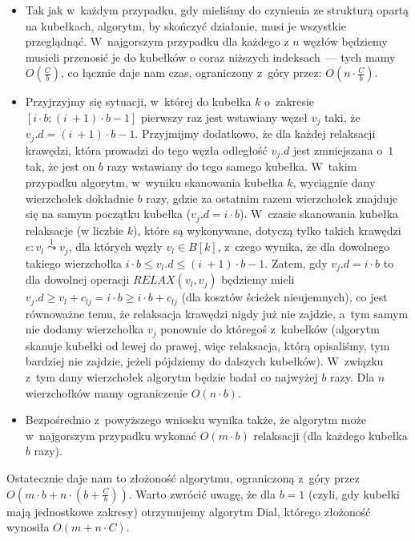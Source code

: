 \begin{itemize}
\item Tak jak w~każdym przypadku, gdy mieliśmy do czynienia ze strukturą opartą na kubełkach, algorytm, by skończyć działanie, musi je wszystkie przeglądnąć. W~najgorszym przypadku dla każdego z $n$ węzłów będziemy musieli przenosić je do kubełków o coraz niższych indeksach~--- tych mamy $O \left( \frac{C}{b} \right)$, co łącznie daje nam czas, ograniczony z~góry przez: $O \left( n \cdot \frac{C}{b} \right)$.
\item Przyjrzyjmy się sytuacji, w~której do kubełka $k$ o~zakresie $\left[ i \cdot b ; \left( i~+ 1 \right) \cdot b - 1 \right]$ pierwszy raz jest wstawiany węzeł $v_{j}$ taki, że $v_{j}.d = \left( i~+ 1 \right) \cdot b - 1$. Przyjmijmy dodatkowo, że dla każdej relaksacji krawędzi, która prowadzi do tego węzła odległość $v_{j}.d$ jest zmniejszana o~$1$ tak, że jest on $b$ razy wstawiany do tego samego kubełka. W~takim przypadku algorytm, w~wyniku skanowania kubełka $k$, wyciągnie dany wierzchołek dokładnie $b$ razy, gdzie za ostatnim razem wierzchołek znajduje się na samym początku kubełka ($v_{j}.d = i \cdot b$). W~czasie skanowania kubełka relaksacje (w liczbie $k$), które są wykonywane, dotyczą tylko takich krawędzi $e : v_{l} \overset{1}\leadsto v_{j}$, dla których węzły $v_{l} \in B \left[ k \right]$, z~czego wynika, że dla dowolnego takiego wierzchołka $ i \cdot b \leqslant v_{l}.d \leqslant \left( i~+ 1 \right) \cdot b - 1$. Zatem, gdy $v_{j}.d = i \cdot b$ to dla dowolnej operacji $RELAX \left( v_{l}, v_{j} \right)$ będziemy mieli $ v_{j}.d \geqslant v_{l} + c_{lj} = i \cdot b \geqslant i \cdot b + c_{lj}$ (dla kosztów ścieżek nieujemnych), co jest równoważne temu, że relaksacja krawędzi nigdy już nie zajdzie, a~tym samym nie dodamy wierzchołka $v_{j}$ ponownie do któregoś z~kubełków (algorytm skanuje kubełki od lewej do prawej, więc relaksacja, którą opisaliśmy, tym bardziej nie zajdzie, jeżeli pójdziemy do dalszych kubełków). W~związku z~tym dany  wierzchołek algorytm będzie badał co najwyżej $b$ razy. Dla $n$ wierzchołków mamy ograniczenie $O \left( n \cdot b \right)$.
\item Bezpośrednio z~powyższego wniosku wynika także, że algorytm może w~najgorszym przypadku wykonać $O \left( m \cdot b \right)$ relaksacji (dla każdego kubełka $b$ razy).
\end{itemize}

Ostatecznie daje nam to złożoność algorytmu, ograniczoną z~góry przez $ O \left( m \cdot b + n \cdot \left( b + \frac{C}{b}\right)\right)$. Warto zwrócić uwagę, że dla $b=1$ (czyli, gdy kubełki mają jednostkowe zakresy) otrzymujemy algorytm Dial, którego złożoność wynosiła $ O \left( m + n \cdot C \right)$.

